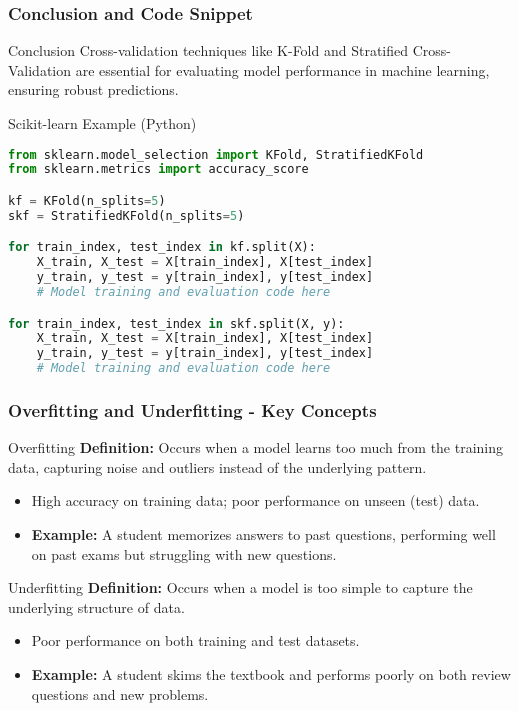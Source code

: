 \documentclass[aspectratio=169]{beamer}
\begin{document}
\begin{frame}[fragile]
    \frametitle{Conclusion and Code Snippet}
    \begin{block}{Conclusion}
        Cross-validation techniques like K-Fold and Stratified Cross-Validation are essential for evaluating model performance in machine learning, ensuring robust predictions.
    \end{block}

    \begin{block}{Scikit-learn Example (Python)}
        \begin{lstlisting}[language=Python]
from sklearn.model_selection import KFold, StratifiedKFold
from sklearn.metrics import accuracy_score

kf = KFold(n_splits=5)
skf = StratifiedKFold(n_splits=5)

for train_index, test_index in kf.split(X):
    X_train, X_test = X[train_index], X[test_index]
    y_train, y_test = y[train_index], y[test_index]
    # Model training and evaluation code here

for train_index, test_index in skf.split(X, y):
    X_train, X_test = X[train_index], X[test_index]
    y_train, y_test = y[train_index], y[test_index]
    # Model training and evaluation code here
        \end{lstlisting}
    \end{block}
\end{frame}

\begin{frame}[fragile]
    \frametitle{Overfitting and Underfitting - Key Concepts}
    \begin{block}{Overfitting}
        \textbf{Definition:} Occurs when a model learns too much from the training data, capturing noise and outliers instead of the underlying pattern.
        \begin{itemize}
            \item High accuracy on training data; poor performance on unseen (test) data.
            \item \textbf{Example:} A student memorizes answers to past questions, performing well on past exams but struggling with new questions.
        \end{itemize}
    \end{block}

    \begin{block}{Underfitting}
        \textbf{Definition:} Occurs when a model is too simple to capture the underlying structure of data.
        \begin{itemize}
            \item Poor performance on both training and test datasets.
            \item \textbf{Example:} A student skims the textbook and performs poorly on both review questions and new problems.
        \end{itemize}
    \end{block}
\end{frame}
\end{document}
